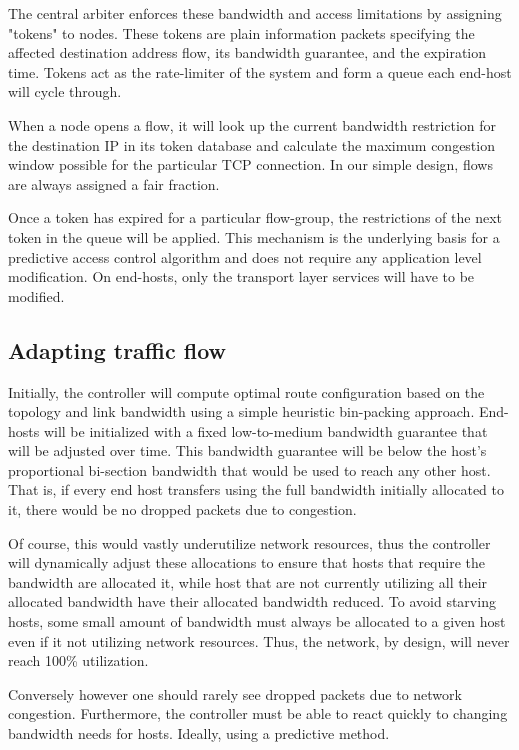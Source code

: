 The central arbiter enforces these bandwidth and access limitations by 
assigning "tokens" to nodes. These tokens are plain information packets 
specifying the affected destination address flow, its bandwidth guarantee, and 
the expiration time. Tokens act as the rate-limiter of the system and form a 
queue each end-host will cycle through.

When a node opens a flow, it will look up the current bandwidth restriction for 
the destination IP in its token database and calculate the maximum congestion 
window possible for the particular TCP connection. In our simple design, flows 
are always assigned a fair fraction.

Once a token has expired for a particular flow-group, the restrictions of the 
next token in the queue will be applied. This mechanism is the underlying basis 
for a predictive access control algorithm and does not require any application 
level modification. On end-hosts, only the transport layer services will have 
to be modified.

\subsection{Adapting traffic flow}

Initially, the controller will compute optimal route configuration based on the 
topology and link bandwidth using a simple heuristic bin-packing approach. 
End-hosts will be initialized with a fixed low-to-medium bandwidth guarantee 
that will be adjusted over time. This bandwidth guarantee will be below the 
host's proportional bi-section bandwidth that would be used to reach any other 
host. That is, if every end host transfers using the full bandwidth initially 
allocated to it,  there would be no dropped packets due to congestion.

Of course, this would vastly underutilize network resources, thus the 
controller will dynamically adjust these allocations to ensure that hosts that 
require the bandwidth are allocated it, while host that are not currently 
utilizing all their allocated bandwidth have their allocated bandwidth reduced. 
To avoid starving hosts, some small amount of bandwidth must always be 
allocated to a given host even if it not utilizing network resources. Thus, the 
network, by design, will never reach 100\% utilization.

Conversely however one should rarely see dropped packets due to network 
congestion. Furthermore, the controller must be able to react quickly to 
changing bandwidth needs for hosts. Ideally, using a predictive method.

